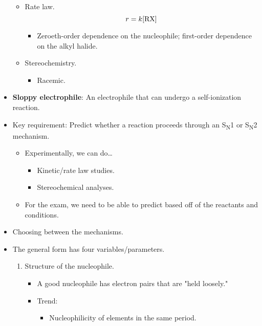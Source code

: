 \documentclass[../notes.tex]{subfiles}
\begin{document}
\begin{itemize}
\begin{itemize}
\begin{itemize}
        \end{itemize}
        \item Rate law.
        \begin{equation*}
            r = k[\ce{RX}]
        \end{equation*}
        \begin{itemize}
            \item Zeroeth-order dependence on the nucleophile; first-order dependence on the alkyl halide.
        \end{itemize}
        \item Stereochemistry.
        \begin{itemize}
            \item Racemic.
        \end{itemize}
    \end{itemize}
    \item \textbf{Sloppy electrophile}: An electrophile that can undergo a self-ionization reaction.
    \item Key requirement: Predict whether a reaction proceeds through an S\textsubscript{N}1 or S\textsubscript{N}2 mechanism.
    \begin{itemize}
        \item Experimentally, we can do\dots
        \begin{itemize}
            \item Kinetic/rate law studies.
            \item Stereochemical analyses.
        \end{itemize}
        \item For the exam, we need to be able to predict based off of the reactants and conditions.
    \end{itemize}
    \item Choosing between the mechanisms.
    \item The general form has four variables/parameters.
    \begin{enumerate}
        \item Structure of the nucleophile.
        \begin{itemize}
            \item A good nucleophile has electron pairs that are "held loosely."
            \item Trend:
            \begin{itemize}
                \item Nucleophilicity of elements in the same period.
                \begin{equation*}

\end{equation*}
\end{itemize}
\end{itemize}
\end{enumerate}
\end{itemize}
\end{document}
